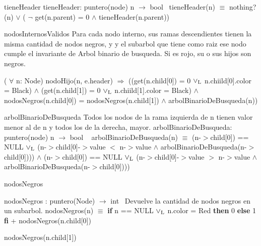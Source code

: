 \begin{DoxyParagraph}{tiene\+Header}
tiene\+Header\+: puntero(node) n $\to$ bool~\newline
tiene\+Header(n) $\equiv$ nothing?(n) $\lor$ ( $\lnot$ get(n.\+parent) = 0 $\land$ tiene\+Header(n.\+parent)) 
\end{DoxyParagraph}


\begin{DoxyParagraph}{nodos\+Internos\+Validos}
Para cada nodo interno, sus ramas descendientes tienen la misma cantidad de nodos negros, y y el subarbol que tiene como raiz ese nodo cumple el invariante de Arbol binario de busqueda. Si es rojo, su o sus hijos son negros.

( $\forall$ n\+: Node) nodo\+Hijo(n, e.\+header) $\Rightarrow$ ((get(n.\+child\mbox{[}0\mbox{]}) = 0 $\lor_{\rm L}$ n.\+chiild\mbox{[}0\mbox{]}.color = Black) $\land$ (get(n.\+child\mbox{[}1\mbox{]}) = 0 $\lor_{\rm L}$ n.\+chiild\mbox{[}1\mbox{]}.color = Black) $\land$ nodos\+Negros(n.\+child\mbox{[}0\mbox{]}) = nodos\+Negros(n.\+child\mbox{[}1\mbox{]}) $\land$ arbol\+Binario\+De\+Busqueda(n)) 
\end{DoxyParagraph}


\begin{DoxyParagraph}{arbol\+Binario\+De\+Busqueda}
Todos los nodos de la rama izquierda de n tienen valor menor al de n y todos los de la derecha, mayor. arbol\+Binario\+De\+Busqueda\+: puntero(node) n $\to$ bool ~\newline
arbol\+Binario\+De\+Busqueda(n) $\equiv$ (n-\/$>$child\mbox{[}0\mbox{]}) == N\+U\+LL $\lor_{\rm L}$ (n-\/$>$child\mbox{[}0\mbox{]}-\/$>$value $<$ n-\/$>$value $\land$ arbol\+Binario\+De\+Busqueda(n-\/$>$child\mbox{[}0\mbox{]}))) $\land$ (n-\/$>$child\mbox{[}0\mbox{]}) == N\+U\+LL $\lor_{\rm L}$ (n-\/$>$child\mbox{[}0\mbox{]}-\/$>$value $>$ n-\/$>$value $\land$ arbol\+Binario\+De\+Busqueda(n-\/$>$child\mbox{[}0\mbox{]}))) 
\end{DoxyParagraph}


\begin{DoxyParagraph}{nodos\+Negros}


nodos\+Negros \+: puntero(\+Node) $\to$ int~\newline
Devuelve la cantidad de nodos negros en un subarbol. nodos\+Negros(n) $\equiv$ {\bfseries if} n == N\+U\+LL $\lor_{\rm L}$ n.\+color = Red {\bfseries then} 0 {\bfseries else} 1 {\bfseries fi} + nodos\+Negros(n.\+child\mbox{[}0\mbox{]})
\begin{DoxyItemize}
\item nodos\+Negros(n.\+child\mbox{[}1\mbox{]}) 
\end{DoxyItemize}
\end{DoxyParagraph}



